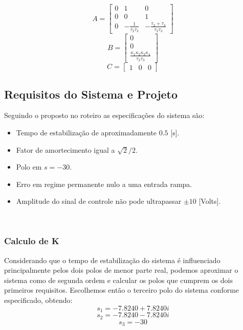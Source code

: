 \documentclass{article}
\begin{document}
\begin{equation}
\label{eq:mata}
A=
\begin{bmatrix}
 0 & 1 & 0 \\
 0 & 0 & 1 \\
 0 & -\frac{1}{\tau_2\tau_3} & -\frac{\tau_2+\tau_3}{\tau_2\tau_3}
\end{bmatrix}
\end{equation}
\begin{equation}
\label{eq:matb}
B=
\begin{bmatrix}
0 \\
0 \\
\frac{\kappa_1\kappa_2\kappa_3\kappa_4}{\tau_2\tau_3}
\end{bmatrix}
\end{equation}
\begin{equation}
\label{eq:matc}
C=
\begin{bmatrix}
1 & 0 & 0
\end{bmatrix}
\end{equation}

\subsection{Requisitos do Sistema e Projeto}
Seguindo o proposto no roteiro \cite{bb:roteiro} as especificações do sistema são:
\begin{itemize}
	\item Tempo de estabilização de aproximadamente $0.5$ [s].
	\item Fator de amortecimento igual a $\sqrt{2}/2$.
	\item Polo em $s=-30$.
	\item Erro em regime permanente nulo a uma entrada rampa.
	\item Amplitude do sinal de controle não pode ultrapassar $\pm10$ [Volts].
\end{itemize}\
\subsubsection{Calculo de K}
Considerando que o tempo de estabilização do sistema é influenciado principalmente pelos dois polos de menor parte real, podemos aproximar o sistema como de segunda ordem e calcular os polos que cumprem os dois primeiros requisitos. Escolhemos então o terceiro polo do sistema conforme especificado, obtendo:
\begin{equation}
	s_1=-7.8240 + 7.8240i
\end{equation}
\begin{equation}
	s_2=-7.8240 - 7.8240i
\end{equation}
\begin{equation}
	s_3=-30
\end{equation}
\end{document}
